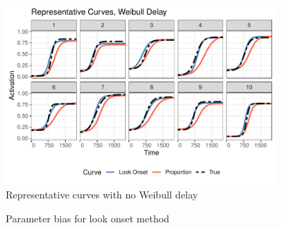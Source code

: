 \documentclass{beamer}
\begin{document}
\begin{frame}
\begin{figure}[H]
\centering
\includegraphics[width=0.9\textwidth]{rep_curves_weibull_delay.pdf}
\caption{Representative curves with no Weibull delay}
\label{fig:rep_curves_no_delay}
\end{figure}
\end{frame}


\begin{frame}
\begin{figure}[H]
\centering
\caption{Parameter bias for look onset method}
\label{fig:par_bias_no_delay}
\end{figure}
\end{frame}
\end{document}
